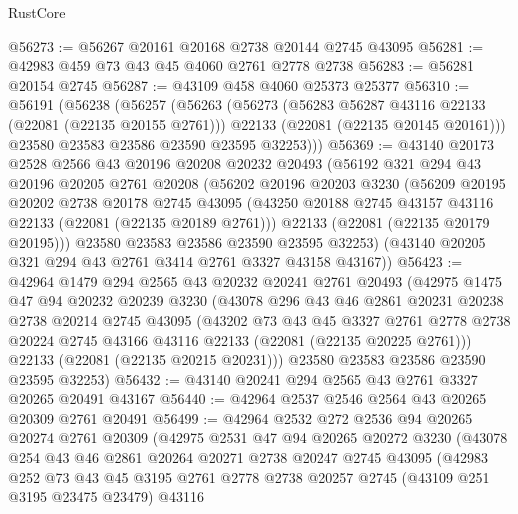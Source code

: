 \begin{lexlean}{RustCore}
\begin{coremodule}
@56273 := @56267 @20161 @20168 @2738 @20144 @2745 @43095
@56281 := @42983 @459 @73 @43 @45 @4060 @2761 @2778 @2738
@56283 := @56281 @20154 @2745
@56287 := @43109 @458 @4060 @25373 @25377
@56310 := @56191
    (@56238
      (@56257
        (@56263
          (@56273
            (@56283 @56287 @43116 @22133 (@22081 (@22135 @20155 @2761)))
            @22133
            (@22081 (@22135 @20145 @20161)))
          @23580
          @23583
          @23586
          @23590
          @23595
          @32253)))
@56369 := @43140
    @20173
    @2528
    @2566
    @43
    @20196
    @20208
    @20232
    @20493
    (@56192
      @321
      @294
      @43
      @20196
      @20205
      @2761
      @20208
      (@56202
        @20196
        @20203
        @3230
        (@56209
          @20195
          @20202
          @2738
          @20178
          @2745
          @43095
          (@43250 @20188 @2745 @43157 @43116 @22133 (@22081 (@22135 @20189 @2761)))
          @22133
          (@22081 (@22135 @20179 @20195)))
        @23580
        @23583
        @23586
        @23590
        @23595
        @32253)
      (@43140 @20205 @321 @294 @43 @2761 @3414 @2761 @3327 @43158 @43167))
@56423 := @42964
    @1479
    @294
    @2565
    @43
    @20232
    @20241
    @2761
    @20493
    (@42975
      @1475
      @47
      @94
      @20232
      @20239
      @3230
      (@43078
        @296
        @43
        @46
        @2861
        @20231
        @20238
        @2738
        @20214
        @2745
        @43095
        (@43202
          @73
          @43
          @45
          @3327
          @2761
          @2778
          @2738
          @20224
          @2745
          @43166
          @43116
          @22133
          (@22081 (@22135 @20225 @2761)))
        @22133
        (@22081 (@22135 @20215 @20231)))
      @23580
      @23583
      @23586
      @23590
      @23595
      @32253)
@56432 := @43140 @20241 @294 @2565 @43 @2761 @3327 @20265 @20491 @43167
@56440 := @42964 @2537 @2546 @2564 @43 @20265 @20309 @2761 @20491
@56499 := @42964
    @2532
    @272
    @2536
    @94
    @20265
    @20274
    @2761
    @20309
    (@42975
      @2531
      @47
      @94
      @20265
      @20272
      @3230
      (@43078
        @254
        @43
        @46
        @2861
        @20264
        @20271
        @2738
        @20247
        @2745
        @43095
        (@42983
          @252
          @73
          @43
          @45
          @3195
          @2761
          @2778
          @2738
          @20257
          @2745
          (@43109 @251 @3195 @23475 @23479)
          @43116

\end{coremodule}
\end{lexlean}
